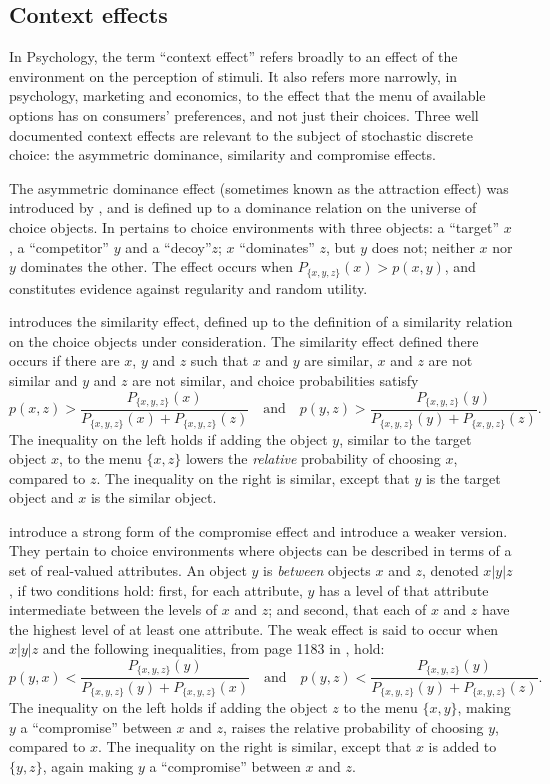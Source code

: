 \documentclass[11pt,letter]{article}
\newcommand{\menu}{menu}
\begin{document}
\subsection{Context effects}

In Psychology, the term ``context effect'' refers broadly to an effect of the environment on the perception of stimuli.
It also refers more narrowly, in psychology, marketing and economics, to the effect that the \menu{} of available options has on consumers' preferences, and not just their choices.
Three well documented context effects are relevant to the subject of stochastic discrete choice: the asymmetric dominance, similarity and compromise effects.

The asymmetric dominance effect (sometimes known as the attraction effect) was introduced by , and is defined up to a dominance relation on the universe of choice objects.
In pertains to choice environments with three objects: a ``target'' $x$, a ``competitor'' $y$ and a ``decoy''$z$; $x$ ``dominates'' $z$, but $y$ does not; neither $x$ nor $y$ dominates the other.
The effect occurs when $P_{\{x,y,z\}}(x) > p(x,y)$, and constitutes evidence against regularity and random utility.

 introduces the similarity effect, defined up to the definition of a similarity relation on the choice objects under consideration.
The similarity effect defined there occurs if there are $x$, $y$ and $z$ such that $x$ and $y$ are similar, $x$ and $z$ are not similar and $y$ and $z$ are not similar, and choice probabilities satisfy
\[
	p(x,z) > \frac{P_{\{x,y,z\}}(x)}{P_{\{x,y,z\}}(x) + P_{\{x,y,z\}}(z)}
	\quad \mbox{and} \quad
	p(y,z) > \frac{P_{\{x,y,z\}}(y)}{P_{\{x,y,z\}}(y) + P_{\{x,y,z\}}(z)}.
\]
The inequality on the left holds if adding the object $y$, similar to the target object $x$, to the \menu{} $\{x,z\}$ lowers the {\em relative} probability of choosing $x$, compared to $z$.
The inequality on the right is similar, except that $y$ is the target object and $x$ is the similar object.

 introduce a strong form of the compromise effect and  introduce a weaker version.
They pertain to choice environments where objects can be described in terms of a set of real-valued attributes.
An object $y$ is {\em between} objects $x$ and $z$, denoted $x|y|z$, if two conditions hold: first, for each attribute, $y$ has a level of that attribute intermediate between the levels of $x$ and $z$; and second, that each of $x$ and $z$ have the highest level of at least one attribute.
The weak effect is said to occur when $x|y|z$ and the following inequalities, from page 1183 in , hold:
\[
	p(y,x) < \frac{P_{\{x,y,z\}}(y)}{P_{\{x,y,z\}}(y) + P_{\{x,y,z\}}(x)}
	\quad \mbox{and} \quad
	p(y,z) < \frac{P_{\{x,y,z\}}(y)}{P_{\{x,y,z\}}(y) + P_{\{x,y,z\}}(z)}.
\]
The inequality on the left holds if adding the object $z$ to the \menu{} $\{x,y\}$, making $y$ a ``compromise'' between $x$ and $z$, raises the relative probability of choosing $y$, compared to $x$.
The inequality on the right is similar, except that $x$ is added to $\{y,z\}$, again making $y$ a ``compromise'' between $x$ and $z$.
\end{document}

